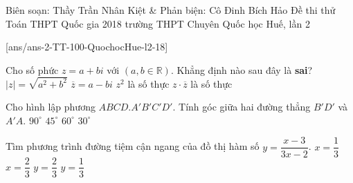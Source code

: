 \begin{name}
{Biên soạn: Thầy Trần Nhân Kiệt \& Phản biện: Cô Đinh Bích Hảo}
{Đề thi thử Toán THPT Quốc gia 2018 trường THPT Chuyên Quốc học Huế, lần 2}
\end{name}
\setcounter{ex}{0}\setcounter{bt}{0}
[ans/ans-2-TT-100-QuochocHue-l2-18]

\begin{ex}%
Cho số phức $z=a+bi$ với $(a, b\in \mathbb{R}).$ Khẳng định nào sau đây là {\bf sai}?
\choice
{$|z|=\sqrt{a^2+b^2}$}
{$\overline{z}=a-bi$}
{\True $z^2$ là số thực}
{$z\cdot\overline{z}$ là số thực}
\end{ex}
\begin{ex}%
Cho hình lập phương $ABCD.A'B'C'D'.$ Tính góc giữa hai đường thẳng $B'D'$ và $A'A.$
\choice
{\True $90^\circ $}
{$45^\circ $}
{$60^\circ $}
{$30^\circ $}
\end{ex}
\begin{ex}%
Tìm phương trình đường tiệm cận ngang của đồ thị hàm số $y=\dfrac{x-3}{3x-2}$.
\choice
{$x=\dfrac{1}{3}$}
{$x=\dfrac{2}{3}$}
{$y=\dfrac{2}{3}$}
{\True $y=\dfrac{1}{3}$}
\end{ex}
